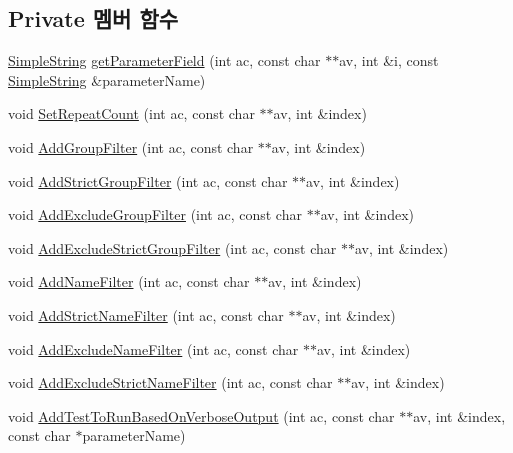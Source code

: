 \subsection*{Private 멤버 함수}
\begin{DoxyCompactItemize}
\item 
\hyperlink{class_simple_string}{Simple\+String} \hyperlink{class_command_line_arguments_acea2499d001a6bd1a67c2ece97a5632c}{get\+Parameter\+Field} (int ac, const char $\ast$$\ast$av, int \&i, const \hyperlink{class_simple_string}{Simple\+String} \&parameter\+Name)
\item 
void \hyperlink{class_command_line_arguments_a5469c3237a8eeeebb60d07e10eb73890}{Set\+Repeat\+Count} (int ac, const char $\ast$$\ast$av, int \&index)
\item 
void \hyperlink{class_command_line_arguments_a5b9e0c238bc7b3bb83f1b0de9bd6cfbc}{Add\+Group\+Filter} (int ac, const char $\ast$$\ast$av, int \&index)
\item 
void \hyperlink{class_command_line_arguments_a5c1cd3ce4d22f1c0ecf7320d8c4e368c}{Add\+Strict\+Group\+Filter} (int ac, const char $\ast$$\ast$av, int \&index)
\item 
void \hyperlink{class_command_line_arguments_ae56f084e31fda94a408e29426b244014}{Add\+Exclude\+Group\+Filter} (int ac, const char $\ast$$\ast$av, int \&index)
\item 
void \hyperlink{class_command_line_arguments_a1ba5f809c48f71c0a03d069365f5763a}{Add\+Exclude\+Strict\+Group\+Filter} (int ac, const char $\ast$$\ast$av, int \&index)
\item 
void \hyperlink{class_command_line_arguments_ada3776b6213e88ce55ec02959c9b8a86}{Add\+Name\+Filter} (int ac, const char $\ast$$\ast$av, int \&index)
\item 
void \hyperlink{class_command_line_arguments_ac9897b3198df515592a4a655818aad6a}{Add\+Strict\+Name\+Filter} (int ac, const char $\ast$$\ast$av, int \&index)
\item 
void \hyperlink{class_command_line_arguments_a76cc113a87e1d2a409218ddb50a7dd5e}{Add\+Exclude\+Name\+Filter} (int ac, const char $\ast$$\ast$av, int \&index)
\item 
void \hyperlink{class_command_line_arguments_a5bf22b45ee1e7d9ba976ac86f6951eb3}{Add\+Exclude\+Strict\+Name\+Filter} (int ac, const char $\ast$$\ast$av, int \&index)
\item 
void \hyperlink{class_command_line_arguments_a54e99e1e87772dec026f6fe352cf472d}{Add\+Test\+To\+Run\+Based\+On\+Verbose\+Output} (int ac, const char $\ast$$\ast$av, int \&index, const char $\ast$parameter\+Name)
$$
\end{DoxyCompactItemize}

